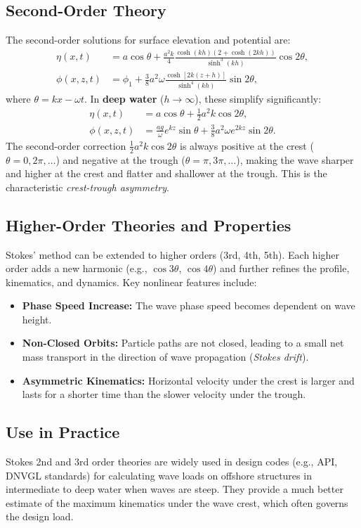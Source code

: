 \documentclass[11pt,a4paper]{article}
\begin{document}
\subsection{Second-Order Theory}
The second-order solutions for surface elevation and potential are:
\begin{align}
\eta(x,t) &= a \cos\theta + \frac{a^2 k}{4} \frac{\cosh(kh)(2 + \cosh(2kh))}{\sinh^3(kh)} \cos 2\theta, \\
\phi(x,z,t) &= \phi_1 + \frac{3}{8} a^2 \omega \frac{\cosh[2k(z+h)]}{\sinh^4(kh)} \sin 2\theta,
\end{align}
where $\theta = kx - \omega t$. In \textbf{deep water} ($h \to \infty$), these simplify significantly:
\begin{align}
\eta(x,t) &= a \cos\theta + \frac{1}{2} a^2 k \cos 2\theta, \\
\phi(x,z,t) &= \frac{a g}{\omega} e^{kz} \sin\theta + \frac{3}{8} a^2 \omega e^{2kz} \sin 2\theta.
\end{align}
The second-order correction $\frac{1}{2} a^2 k \cos 2\theta$ is always positive at the crest ($\theta=0, 2\pi, \dots$) and negative at the trough ($\theta=\pi, 3\pi, \dots$), making the wave sharper and higher at the crest and flatter and shallower at the trough. This is the characteristic \emph{crest-trough asymmetry}.

\subsection{Higher-Order Theories and Properties}
Stokes' method can be extended to higher orders (3rd, 4th, 5th). Each higher order adds a new harmonic (e.g., $\cos 3\theta$, $\cos 4\theta$) and further refines the profile, kinematics, and dynamics. Key nonlinear features include:
\begin{itemize}
    \item \textbf{Phase Speed Increase:} The wave phase speed becomes dependent on wave height.
    \item \textbf{Non-Closed Orbits:} Particle paths are not closed, leading to a small net mass transport in the direction of wave propagation (\emph{Stokes drift}).
    \item \textbf{Asymmetric Kinematics:} Horizontal velocity under the crest is larger and lasts for a shorter time than the slower velocity under the trough.
\end{itemize}

\subsection{Use in Practice}
Stokes 2nd and 3rd order theories are widely used in design codes (e.g., API, DNVGL standards) for calculating wave loads on offshore structures in intermediate to deep water when waves are steep. They provide a much better estimate of the maximum kinematics under the wave crest, which often governs the design load.
\end{document}
